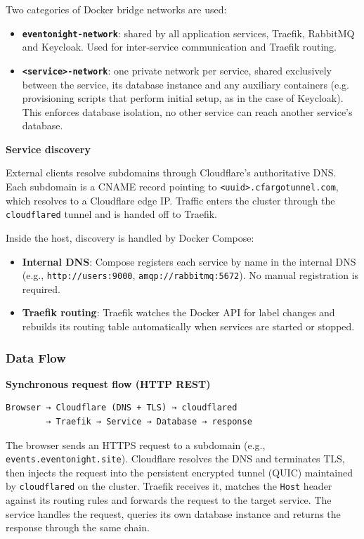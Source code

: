 Two categories of Docker bridge networks are used:

\begin{itemize}
  \item \textbf{\texttt{eventonight-network}}: shared by all application services, Traefik, RabbitMQ and Keycloak. Used for inter-service communication and Traefik routing.
  \item \textbf{\texttt{<service>-network}}: one private network per service, shared exclusively between the service, its database instance and any auxiliary containers (e.g. provisioning scripts that perform initial setup, as in the case of Keycloak). This enforces database isolation, no other service can reach another service's database.
\end{itemize}

\noindent\textbf{Service discovery}

External clients resolve subdomains through Cloudflare's authoritative DNS. Each subdomain is a CNAME record pointing to \texttt{<uuid>.cfargotunnel.com}, which resolves to a Cloudflare edge IP. Traffic enters the cluster through the \texttt{cloudflared} tunnel and is handed off to Traefik.

Inside the host, discovery is handled by Docker Compose:

\begin{itemize}
  \item \textbf{Internal DNS}: Compose registers each service by name in the internal DNS (e.g., \texttt{http://users:9000}, \texttt{amqp://rabbitmq:5672}). No manual registration is required.
  \item \textbf{Traefik routing}: Traefik watches the Docker API for label changes and rebuilds its routing table automatically when services are started or stopped.
\end{itemize}

\subsubsection{Data Flow}

\noindent\textbf{Synchronous request flow (HTTP REST)}

\begin{verbatim}
Browser → Cloudflare (DNS + TLS) → cloudflared
        → Traefik → Service → Database → response
\end{verbatim}

The browser sends an HTTPS request to a subdomain (e.g., \texttt{events.eventonight.site}). Cloudflare resolves the DNS and terminates TLS, then injects the request into the persistent encrypted tunnel (QUIC) maintained by \texttt{cloudflared} on the cluster. Traefik receives it, matches the \texttt{Host} header against its routing rules and forwards the request to the target service. The service handles the request, queries its own database instance and returns the response through the same chain.

